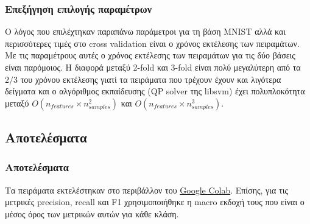 \documentclass{beamer}
\begin{document}
\begin{frame}
\frametitle{Επεξήγηση επιλογής παραμέτρων}

Ο λόγος που επιλέχτηκαν παραπάνω παράμετροι για τη βάση MNIST αλλά και
περισσότερες τιμές στο cross validation είναι ο χρόνος εκτέλεσης των πειραμάτων.
Με τις παραμέτρους αυτές ο χρόνος εκτέλεσης των πειραμάτων για τις δύο βάσεις
είναι παρόμοιος. Η διαφορά μεταξύ 2-fold και 3-fold είναι πολύ μεγαλύτερη από τα
$2/3$ του χρόνου εκτέλεσης γιατί τα πειράματα που τρέχουν έχουν και λιγότερα
δείγματα και ο αλγόριθμος εκπαίδευσης (QP solver της libsvm) έχει πολυπλοκότητα
μεταξύ $O(n_{features} \times n^2_{samples})$ και $O(n_{features} \times
n^3_{samples})$.

\end{frame}

\subsection{Αποτελέσματα}

\begin{frame}
\frametitle{Αποτελέσματα}

Τα πειράματα εκτελέστηκαν στο περιβάλλον του
\href{https://colab.research.google.com/}{Google Colab}. Επίσης, για τις
μετρικές precision, recall και F1 χρησιμοποιήθηκε η macro εκδοχή τους που είναι
ο μέσος όρος των μετρικών αυτών για κάθε κλάση.

\end{frame}
\end{document}
